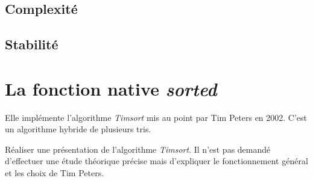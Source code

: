 \documentclass[a4paper,11pt]{article}
\begin{document}
\begin{Form}
\subsection{Complexité}
\subsection{Stabilité}
\section{La fonction native \emph{sorted}}
Elle implémente l'algorithme \emph{Timsort} mis au point par Tim Peters en 2002. C'est un algorithme hybride de plusieurs tris.
\begin{activite}
Réaliser une présentation de l'algorithme \emph{Timsort}. Il n'est pas demandé d'effectuer une étude théorique précise mais d'expliquer le fonctionnement général et les choix de Tim Peters.
\end{activite}
\end{Form}
\end{document}
